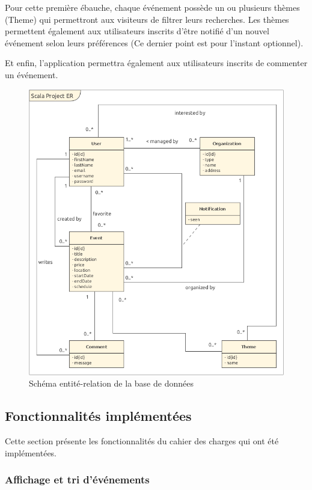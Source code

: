 \documentclass[11pt, a4paper, french, twoside]{article}
\begin{document}
			Pour cette première ébauche, chaque événement possède un ou plusieurs thèmes (Theme) qui permettront aux visiteurs de filtrer leurs recherches. Les thèmes permettent également aux utilisateurs inscrits d'être notifié d'un nouvel événement selon leurs préférences (Ce dernier point est pour l'instant optionnel).
			
			Et enfin, l'application permettra également aux utilisateurs inscrits de commenter un événement.
			
			\begin{figure}[h]
				\centering
				\includegraphics[width=0.8\linewidth]{images/project_ER.png}
				\caption{Schéma entité-relation de la base de données}
				\label{fig:er}
			\end{figure}
		
		\subsection{Fonctionnalités implémentées}
		\label{subsec:fonctionnalites_implementees}
		
			Cette section présente les fonctionnalités du cahier des charges qui ont été implémentées.
		
			\subsubsection{Affichage et tri d'événements}
			\label{subsubsec:affichage_tri_evenements}
			
\end{document}
